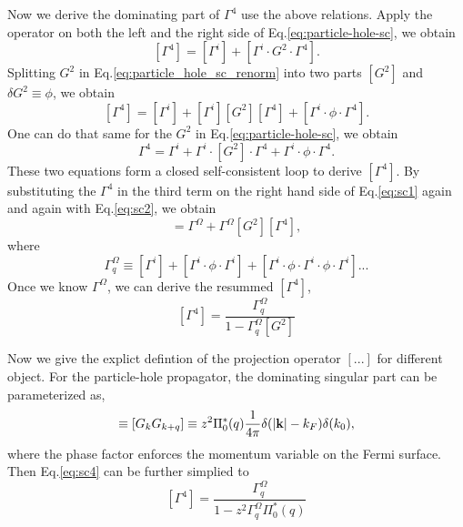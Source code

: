 \documentclass[reprint,amsmath,amssymb,aps,prb]{revtex4-1}
\begin{document}
Now we derive the dominating part of $\Gamma^4$ use the above relations.
Apply the operator on both the left and the right side of Eq.\eqref{eq:particle-hole-sc}, we obtain
\begin{equation}
    \label{eq:particle_hole_sc_renorm}
    [\Gamma^4] = [\Gamma^{i}]+[\Gamma^{i}\cdot G^2 \cdot \Gamma^4].
\end{equation}
Splitting $G^2$ in Eq.\eqref{eq:particle_hole_sc_renorm}
into two parts $[G^2]$ and $\delta G^2 \equiv \phi$, we obtain
\begin{equation}
    \label{eq:sc1}
    [\Gamma^4] = [\Gamma^{i}]+[\Gamma^{i}][G^2][\Gamma^4] + [\Gamma^{i}\cdot \phi \cdot \Gamma^4].
\end{equation}
One can do that same for the $G^2$ in Eq.\eqref{eq:particle-hole-sc}, we obtain
\begin{equation}
    \label{eq:sc2}
    \Gamma^4 = \Gamma^{i}+\Gamma^{i}\cdot[G^2]\cdot \Gamma^4 + \Gamma^{i}\cdot \phi \cdot \Gamma^4.
\end{equation}
These two equations form a closed self-consistent loop to derive $[\Gamma^4]$. By substituting
the $\Gamma^4$ in the third term on the right hand side of Eq.\eqref{eq:sc1} again and again with Eq.\eqref{eq:sc2},
we obtain
\begin{equation}
    [\Gamma^4] = \Gamma^\Omega+\Gamma^\Omega[G^2][\Gamma^4],
\end{equation}
where
\begin{equation}
    \label{eq:sc3}
    \Gamma^\Omega_q \equiv [\Gamma^{i}]+[\Gamma^{i}\cdot \phi \cdot \Gamma^{i}]+[\Gamma^{i}\cdot \phi \cdot \Gamma^{i}\cdot \phi \cdot \Gamma^{i}]...
\end{equation}
Once we know $\Gamma^\Omega$, we can derive the resummed $[\Gamma^4]$,
\begin{equation}
    \label{eq:sc4}
    [\Gamma^4] = \frac{\Gamma^\Omega_q}{1-\Gamma^\Omega_q [G^2]}
\end{equation}

Now we give the explict defintion of the projection operator $[...]$ for different object.
For the particle-hole propagator, the dominating singular part can be parameterized as,
\begin{equation}
    [G^2] \equiv [G_k G_{k+q}] \equiv z^2 \Pi_0^*(q)\frac{1}{4\pi}\delta(|{\bf{k}}|-k_F)\delta(k_0),
\end{equation}
where the phase factor enforces the momentum variable on the Fermi surface. Then Eq.\eqref{eq:sc4} can be further simplied to
\begin{equation}
    \label{eq:sc5}
    [\Gamma^4] = \frac{\Gamma^\Omega_q}{1-z^2\Gamma^\Omega_q \Pi_0^*(q)}
\end{equation}
\end{document}
